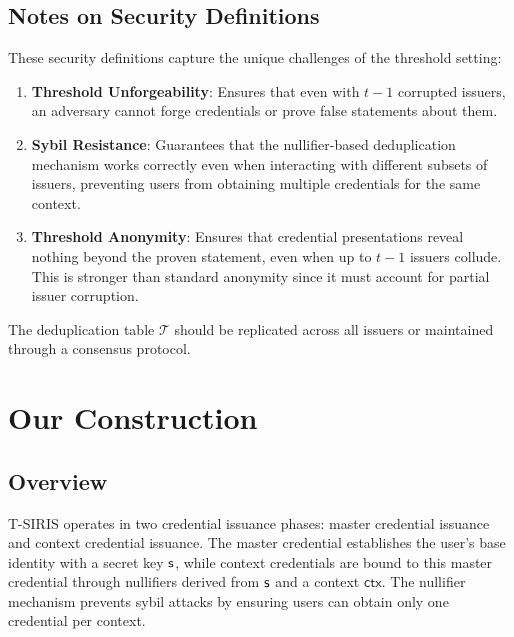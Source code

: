 \subsection{Notes on Security Definitions}

These security definitions capture the unique challenges of the threshold setting:

\begin{enumerate}
    \item \textbf{Threshold Unforgeability}: Ensures that even with $t-1$ corrupted issuers, an adversary cannot forge credentials or prove false statements about them.

    \item \textbf{Sybil Resistance}: Guarantees that the nullifier-based deduplication mechanism works correctly even when interacting with different subsets of issuers, preventing users from obtaining multiple credentials for the same context.

    \item \textbf{Threshold Anonymity}: Ensures that credential presentations reveal nothing beyond the proven statement, even when up to $t-1$ issuers collude. This is stronger than standard anonymity since it must account for partial issuer corruption.
\end{enumerate}

The deduplication table $\mathcal{T}$ should be replicated across all issuers or maintained through a consensus protocol.


















\section{Our Construction}\label{chap5:ourconstruction}

\subsection{Overview}
T-SIRIS operates in two credential issuance phases: master credential issuance and context credential issuance. The master credential establishes the user's base identity with a secret key $\mathsf{s}$, while context credentials are bound to this master credential through nullifiers derived from $\mathsf{s}$ and a context $\mathsf{ctx}$. The nullifier mechanism prevents sybil attacks by ensuring users can obtain only one credential per context.


